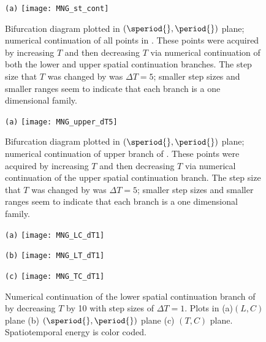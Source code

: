\begin{figure}
\begin{minipage}[height=.20\textheight]{.8\textwidth}
\centering \small{\texttt{(a)}}
\texttt{[image: MNG\_st\_cont]}
\end{minipage}
\caption{ \label{fig:MNG_hook_st_cont}
Bifurcation diagram plotted in $(\speriod{},\period{})$ plane; numerical continuation of all points in .
These points were acquired by increasing $T$ and then decreasing $T$ via numerical continuation of both the lower and upper spatial continuation branches. The step size that $T$ was changed by was $\Delta T = 5$; smaller step sizes and smaller ranges seem to indicate that each branch is a one dimensional family.
}
\end{figure}

\begin{figure}
\begin{minipage}[height=.20\textheight]{.8\textwidth}
\centering \small{\texttt{(a)}}
\texttt{[image: MNG\_upper\_dT5]}
\end{minipage}
\caption{ \label{fig:MNG_upper_dT5}
Bifurcation diagram plotted in $(\speriod{},\period{})$ plane; numerical continuation of upper branch of .
These points were acquired by increasing $T$ and then decreasing $T$ via numerical continuation of the upper spatial continuation branch. The step size that $T$ was changed by was $\Delta T = 5$; smaller step sizes and smaller ranges seem to indicate that each branch is a one dimensional family.
}
\end{figure}


\begin{figure}
\begin{minipage}[height=.20\textheight]{.30\textwidth}
\centering \small{\texttt{(a)}}
\texttt{[image: MNG\_LC\_dT1]}
\end{minipage}
\begin{minipage}[height=.20\textheight]{.30\textwidth}
\centering \small{\texttt{(b)}}
\texttt{[image: MNG\_LT\_dT1]}
\end{minipage}
\begin{minipage}[height=.20\textheight]{.30\textwidth}
\centering \small{\texttt{(c)}}
\texttt{[image: MNG\_TC\_dT1]}
\end{minipage}
\caption{ \label{fig:MNG_lower_dT1}
Numerical continuation of the lower spatial continuation branch of
 by decreasing $T$ by 10 with step
sizes of $\Delta T = 1$. Plots in (a)$(L,C)$ plane (b) $(\speriod{},\period{})$ plane
(c) $(T,C)$ plane. Spatiotemporal energy is color coded.
}
\end{figure}

